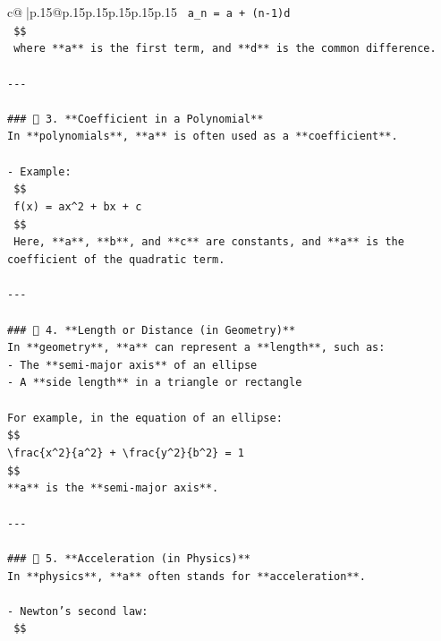 \documentclass{article}
\begin{document}
{\begin{supertabular}{c@{$\;$}|p{.15\linewidth}@{}p{.15\linewidth}p{.15\linewidth}p{.15\linewidth}p{.15\linewidth}p{.15\linewidth}}
{{{\texttt{  a\_n = a + (n{-}1)d} \\
\texttt{  \$\$} \\
\texttt{  where **a** is the first term, and **d** is the common difference.} \\
\\ 
\texttt{{-}{-}{-}} \\
\\ 
\texttt{\#\#\# 🔹 3. **Coefficient in a Polynomial**} \\
\texttt{In **polynomials**, **a** is often used as a **coefficient**.} \\
\\ 
\texttt{{-} Example:  } \\
\texttt{  \$\$} \\
\texttt{  f(x) = ax\^{}2 + bx + c} \\
\texttt{  \$\$} \\
\texttt{  Here, **a**, **b**, and **c** are constants, and **a** is the coefficient of the quadratic term.} \\
\\ 
\texttt{{-}{-}{-}} \\
\\ 
\texttt{\#\#\# 🔹 4. **Length or Distance (in Geometry)**} \\
\texttt{In **geometry**, **a** can represent a **length**, such as:} \\
\texttt{{-} The **semi{-}major axis** of an ellipse} \\
\texttt{{-} A **side length** in a triangle or rectangle} \\
\\ 
\texttt{For example, in the equation of an ellipse:} \\
\texttt{\$\$} \\
\texttt{\textbackslash{}frac\{x\^{}2\}\{a\^{}2\} + \textbackslash{}frac\{y\^{}2\}\{b\^{}2\} = 1} \\
\texttt{\$\$} \\
\texttt{**a** is the **semi{-}major axis**.} \\
\\ 
\texttt{{-}{-}{-}} \\
\\ 
\texttt{\#\#\# 🔹 5. **Acceleration (in Physics)**} \\
\texttt{In **physics**, **a** often stands for **acceleration**.} \\
\\ 
\texttt{{-} Newton’s second law:  } \\
\texttt{  \$\$} \\
}}}
\end{supertabular}}
\end{document}
